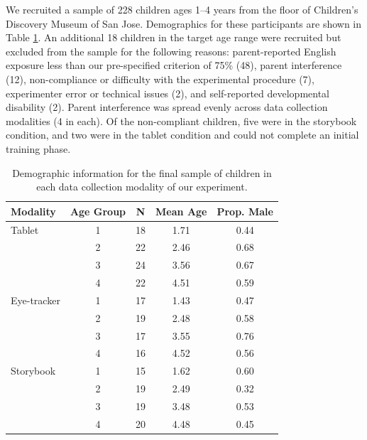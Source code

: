 \documentclass[man,noapacite]{apa2}
\begin{document}

We recruited a sample of 228 children ages 1--4 years from the floor of Children's Discovery Museum of San Jose. Demographics for these participants are shown in Table \ref{tab:demo}. An additional 18 children in the target age range were recruited but excluded from the sample for the following reasons: parent-reported English exposure less than our pre-specified criterion of 75\% (48), parent interference (12), non-compliance or difficulty with the experimental procedure (7), experimenter error or technical issues (2), and self-reported developmental disability (2). Parent interference was spread evenly across data collection modalities (4 in each). Of the non-compliant children, five were in the storybook condition, and two were in the tablet condition and could not complete an initial training phase.  

\begin{table}[ht]
\centering
\caption{\label{tab:demo} Demographic information for the final sample of children in each data collection modality of our experiment.}
\begin{tabular}{lcccc}
  \hline
 Modality & Age Group & N & Mean Age & Prop. Male \\ 
  \hline
Tablet  & 1 &  18 & 1.71 & 0.44 \\ 
           & 2 &  22 & 2.46 & 0.68 \\ 
           & 3 &  24 & 3.56 & 0.67 \\ 
           & 4 &  22 & 4.51 & 0.59 \\  
Eye-tracker & 1 &  17 & 1.43 & 0.47 \\ 
           & 2 &  19 & 2.48 & 0.58 \\ 
           & 3 &  17 & 3.55 & 0.76 \\ 
           & 4 &  16 & 4.52 & 0.56 \\ 
Storybook & 1 &  15 & 1.62 & 0.60 \\ 
           & 2 &  19 & 2.49 & 0.32 \\ 
           & 3 &  19 & 3.48 & 0.53 \\ 
           & 4 &  20 & 4.48 & 0.45 \\ 
   \hline
\end{tabular}
\end{table}
\end{document}
